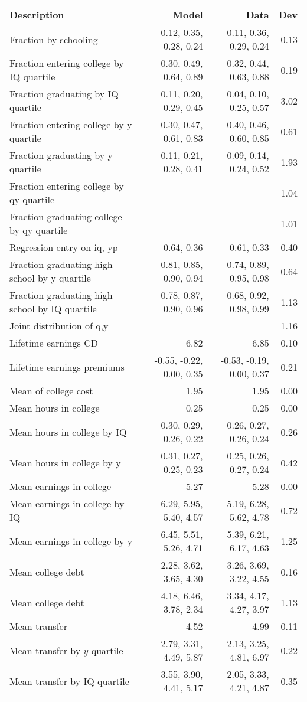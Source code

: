 \begin{tabular}{lrrr}
\hline
Description & Model  & Data  & Dev  \\ 
\hline
Fraction by schooling & 0.12, 0.35, 0.28, 0.24  & 0.11, 0.36, 0.29, 0.24  & 0.13  \\ 
Fraction entering college by IQ quartile & 0.30, 0.49, 0.64, 0.89  & 0.32, 0.44, 0.63, 0.88  & 0.19  \\ 
Fraction graduating by IQ quartile & 0.11, 0.20, 0.29, 0.45  & 0.04, 0.10, 0.25, 0.57  & 3.02  \\ 
Fraction entering college by y quartile & 0.30, 0.47, 0.61, 0.83  & 0.40, 0.46, 0.60, 0.85  & 0.61  \\ 
Fraction graduating by y quartile & 0.11, 0.21, 0.28, 0.41  & 0.09, 0.14, 0.24, 0.52  & 1.93  \\ 
Fraction entering college by qy quartile &   &   & 1.04  \\ 
Fraction graduating college by qy quartile &   &   & 1.01  \\ 
Regression entry on iq, yp & 0.64, 0.36  & 0.61, 0.33  & 0.40  \\ 
Fraction graduating high school by y quartile & 0.81, 0.85, 0.90, 0.94  & 0.74, 0.89, 0.95, 0.98  & 0.64  \\ 
Fraction graduating high school by IQ quartile & 0.78, 0.87, 0.90, 0.96  & 0.68, 0.92, 0.98, 0.99  & 1.13  \\ 
Joint distribution of q,y &   &   & 1.16  \\ 
Lifetime earnings CD & 6.82  & 6.85  & 0.10  \\ 
Lifetime earnings premiums & -0.55, -0.22, 0.00, 0.35  & -0.53, -0.19, 0.00, 0.37  & 0.21  \\ 
Mean of college cost & 1.95  & 1.95  & 0.00  \\ 
Mean hours in college & 0.25  & 0.25  & 0.00  \\ 
Mean hours in college by IQ & 0.30, 0.29, 0.26, 0.22  & 0.26, 0.27, 0.26, 0.24  & 0.26  \\ 
Mean hours in college by y & 0.31, 0.27, 0.25, 0.23  & 0.25, 0.26, 0.27, 0.24  & 0.42  \\ 
Mean earnings in college & 5.27  & 5.28  & 0.00  \\ 
Mean earnings in college by IQ & 6.29, 5.95, 5.40, 4.57  & 5.19, 6.28, 5.62, 4.78  & 0.72  \\ 
Mean earnings in college by y & 6.45, 5.51, 5.26, 4.71  & 5.39, 6.21, 6.17, 4.63  & 1.25  \\ 
Mean college debt & 2.28, 3.62, 3.65, 4.30  & 3.26, 3.69, 3.22, 4.55  & 0.16  \\ 
Mean college debt & 4.18, 6.46, 3.78, 2.34  & 3.34, 4.17, 4.27, 3.97  & 1.13  \\ 
Mean transfer & 4.52  & 4.99  & 0.11  \\ 
Mean transfer by $y$ quartile & 2.79, 3.31, 4.49, 5.87  & 2.13, 3.25, 4.81, 6.97  & 0.22  \\ 
Mean transfer by IQ quartile & 3.55, 3.90, 4.41, 5.17  & 2.05, 3.33, 4.21, 4.87  & 0.35  \\ 
\hline
\end{tabular}%
